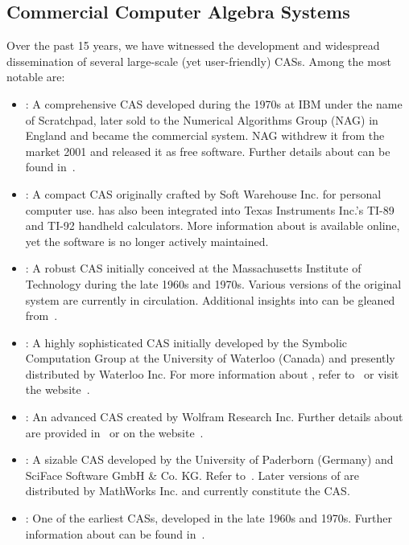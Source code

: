 \subsection{Commercial Computer Algebra Systems}

Over the past 15 years, we have witnessed the development and widespread dissemination of several large-scale (yet user-friendly) \acp{CAS}. Among the most notable are:
%
\begin{itemize}
  \setlength{\itemsep}{0.0em}
  \item \Axiom{}: A comprehensive \ac{CAS} developed during the 1970s at IBM under the name of Scratchpad, later sold to the Numerical Algorithms Group (NAG) in England and became the \Axiom{} commercial system. NAG withdrew it from the market 2001 and released it as free software. Further details about \Axiom{} can be found in~\citet{jenks1992axiom}.
  \item \Derive{}: A compact \ac{CAS} originally crafted by Soft Warehouse Inc. for personal computer use. \Derive{} has also been integrated into Texas Instruments Inc.'s TI-89 and TI-92 handheld calculators. More information about \Derive{} is available online, yet the software is no longer actively maintained.
  \item \Macsyma{}: A robust \ac{CAS} initially conceived at the Massachusetts Institute of Technology during the late 1960s and 1970s. Various versions of the original \Macsyma{} system are currently in circulation. Additional insights into \Macsyma{} can be gleaned from~\citet{wester1999computer}.
  \item \Maple{}: A highly sophisticated \ac{CAS} initially developed by the Symbolic Computation Group at the University of Waterloo (Canada) and presently distributed by Waterloo \Maple{} Inc. For more information about \Maple{}, refer to~\citet{heck2003introduction} or visit the website~\cite{maple}.
  \item \Mathematica{}: An advanced \ac{CAS} created by Wolfram Research Inc. Further details about \Mathematica{} are provided in~\citet{wolfram2003mathematica} or on the website~\cite{mathematica}.
  \item \MuPAD{}: A sizable \ac{CAS} developed by the University of Paderborn (Germany) and SciFace Software GmbH \& Co. KG. Refer to~\citet{creutzig2004mupad}. Later versions of \MuPAD{} are distributed by MathWorks Inc. and currently constitute the \Matlab{} \ac{CAS}.
  \item \Reduce{}: One of the earliest \acp{CAS}, developed in the late 1960s and 1970s. Further information about \Reduce{} can be found in~\citet{rayna1987reduce}.
\end{itemize}
